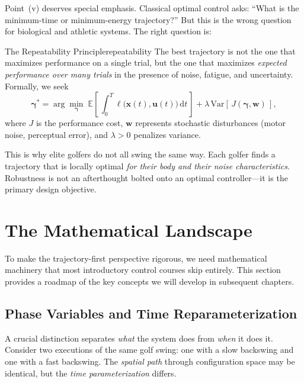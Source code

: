 \documentclass[12pt, openany]{book}
\theoremstyle{plain}
\newcommand{\state}{\bm{x}}
\newcommand{\control}{\bm{u}}
\newcommand{\traj}{\bm{\gamma}}
\newcommand{\dd}{\mathrm{d}}
\newcommand{\dt}{\,\dd t}
\begin{document}
Point~(v) deserves special emphasis. Classical optimal control asks: ``What is
the minimum-time or minimum-energy trajectory?'' But this is the wrong question
for biological and athletic systems. The right question is:

\begin{principle}{The Repeatability Principle}{repeatability}
  The best trajectory is not the one that maximizes performance on a single trial,
  but the one that maximizes \emph{expected performance over many trials} in the
  presence of noise, fatigue, and uncertainty. Formally, we seek
  \begin{equation}\label{eq:repeatability}
    \traj^* = \arg\min_{\traj} \;
    \mathbb{E}\!\left[\, \int_0^T
      \ell\bigl(\state(t), \control(t)\bigr) \dt \,\right]
    + \lambda \, \mathrm{Var}\!\left[\, J(\traj, \bm{w}) \,\right],
  \end{equation}
  where $J$ is the performance cost, $\bm{w}$ represents stochastic disturbances
  (motor noise, perceptual error), and $\lambda > 0$ penalizes variance.
\end{principle}

This is why elite golfers do not all swing the same way. Each golfer finds a
trajectory that is locally optimal \emph{for their body and their noise characteristics}.
Robustness is not an afterthought bolted onto an optimal controller---it is the
primary design objective.

\section{The Mathematical Landscape}

To make the trajectory-first perspective rigorous, we need mathematical machinery
that most introductory control courses skip entirely. This section provides a roadmap
of the key concepts we will develop in subsequent chapters.

\subsection{Phase Variables and Time Reparameterization}

A crucial distinction separates \emph{what} the system does from \emph{when} it
does it. Consider two executions of the same golf swing: one with a slow backswing
and one with a fast backswing. The \emph{spatial path} through configuration space
may be identical, but the \emph{time parameterization} differs.
\end{document}

